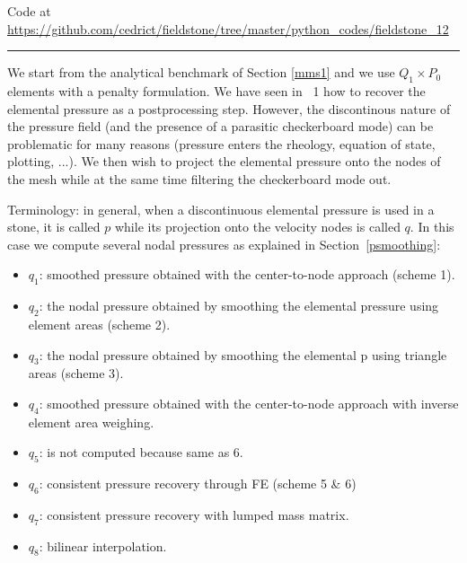

\begin{center}
Code at \url{https://github.com/cedrict/fieldstone/tree/master/python_codes/fieldstone_12}
\end{center}

\par\noindent\rule{\textwidth}{0.4pt}

We start from the analytical benchmark of Section \ref{mms1} and we use $Q_1 \times P_0$
elements with a penalty formulation. 
We have seen in \stone~1 how to recover the elemental pressure as a postprocessing step. 
However, the discontinous nature of the pressure field (and the presence of a
parasitic checkerboard mode) can be problematic for many reasons 
(pressure enters the rheology, equation of state, plotting, ...). 
We then wish to project the elemental pressure onto the nodes of the mesh while at the same 
time filtering the checkerboard mode out. 

Terminology: in general, when a discontinuous elemental pressure is used in a stone, 
it is called $p$ while its projection onto the velocity nodes is called $q$. 
In this case we compute several nodal pressures as explained in Section~\ref{psmoothing}:

\begin{itemize}
\item $q_1$: smoothed pressure obtained with the  center-to-node approach (scheme 1).

\item $q_2$: the nodal pressure obtained by smoothing the elemental pressure using element areas (scheme 2).

\item $q_3$: the nodal pressure obtained by smoothing the elemental p using triangle areas (scheme 3).

\item $q_4$: smoothed pressure obtained with the center-to-node approach with inverse element area weighing.

\item $q_5$: is not computed because same as 6.

\item $q_6$: consistent pressure recovery through FE (scheme 5 \& 6)

\item $q_7$: consistent pressure recovery with lumped mass matrix. 

\item $q_8$: bilinear interpolation. 

\end{itemize}


